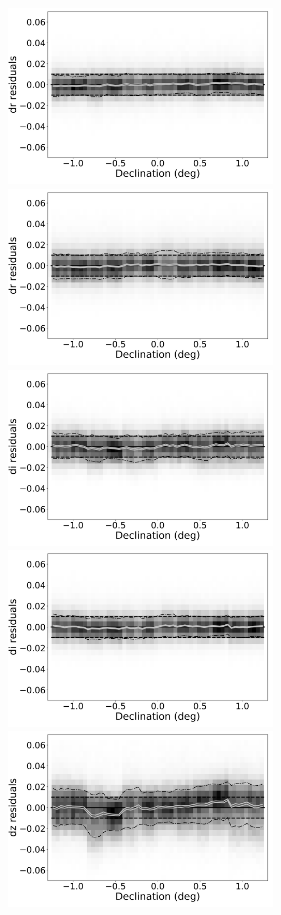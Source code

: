 \documentclass[fleqn,usenatbib]{mnras}
\begin{document}
\begin{figure}[th!]
    \centering\includegraphics[width=7cm]{figures/colorResidDES42bright_dr_Dec_Hess.png}
    \centering\includegraphics[width=7cm]{figures/colorResidPSDR2v42bright_dr_Dec_Hess.png}
    \centering\includegraphics[width=7cm]{figures/colorResidDES42bright_di_Dec_Hess.png}
    \centering\includegraphics[width=7cm]{figures/colorResidPSDR2v42bright_di_Dec_Hess.png}
    \centering\includegraphics[width=7cm]{figures/colorResidDES42bright_dz_Dec_Hess.png}

\end{figure}
\end{document}
